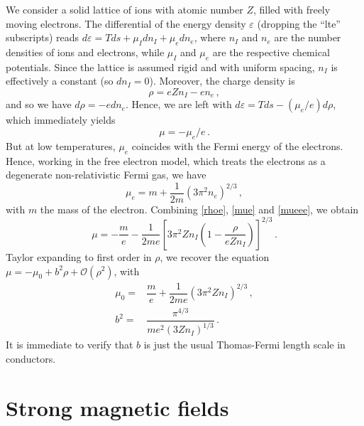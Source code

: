 \documentclass[a4paper, amsfonts, amssymb, amsmath, reprint, showkeys, nofootinbib, twoside,notitlepage]{revtex4-1}
\theoremstyle{definition}
\theoremstyle{theorem}
\begin{document}
We consider a solid lattice of ions with atomic number $Z$, filled with freely moving electrons. The differential of the energy density $\varepsilon$ (dropping the ``lte'' subscripts) reads $d\varepsilon =T ds+ \mu_I dn_I +\mu_e dn_e$,
where $n_I$ and $n_e$ are the number densities of ions and electrons, while $\mu_I$ and $\mu_e$ are the respective chemical potentials. Since the lattice is assumed rigid and with uniform spacing, $n_I$ is effectively a constant (so $dn_I=0$). Moreover, the charge density is 
\begin{equation}\label{rhoe}
\rho=eZn_I-en_e  \, ,  
\end{equation}
and so we have $d\rho=-e dn_e$. Hence, we are left with $d\varepsilon =T ds -(\mu_e/e) d\rho$, which immediately yields 
\begin{equation}\label{mue}
\mu=-\mu_e/e\, .
\end{equation}
But at low temperatures, $\mu_e$ coincides with the Fermi energy of the electrons. Hence, working in the free electron model, which treats the electrons as a degenerate non-relativistic Fermi gas, we have
\begin{equation}\label{mueee}
\mu_e =m+\dfrac{1}{2m} (3\pi^2 n_e)^{2/3} \, ,
\end{equation}
with $m$ the mass of the electron. Combining \eqref{rhoe}, \eqref{mue} and \eqref{mueee}, we obtain 
\begin{equation}
\mu =-\dfrac{m}{e} -\dfrac{1}{2me} \left[3\pi^2 Zn_I\left( 1-\dfrac{\rho}{eZn_I}\right) \right]^{2/3}\, .
\end{equation}
Taylor expanding to first order in $\rho$, we recover the equation $\mu=-\mu_0+b^2\rho+\mathcal{O}(\rho^2)$, with 
\begin{equation}
\begin{split}
\mu_0 ={}& \dfrac{m}{e}+\dfrac{1}{2me} (3\pi^2 Zn_I)^{2/3} \, , \\
b^2={}& \dfrac{\pi^{4/3}}{me^2 (3Z n_I)^{1/3}}\, .
\end{split}
\end{equation}
It is immediate to verify that $b$ is just the usual Thomas-Fermi length scale in conductors.


\newpage
\section*{Strong magnetic fields}
\end{document}
